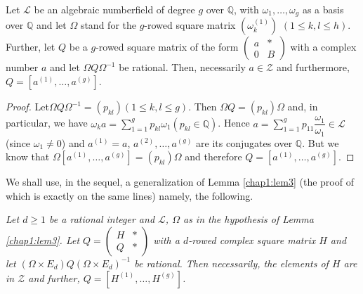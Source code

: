 \begin{lem}\label{chap1:lem3}
Let $\mathscr{L}$ be an algebraic numberfield of degree $g$ over
$\mathbb{Q}$, with $\omega_{1},\ldots,\omega_{g}$ as a basis over
$\mathbb{Q}$ and let $\Omega$ stand for the $g$-rowed square matrix
$(\omega^{(1)}_{k})$ $(1\leq k,l\leq h)$. Further, let $Q$ be a
$g$-rowed square matrix of the form $\left(\begin{smallmatrix} a &
  \ast\\ 0 & B\end{smallmatrix}\right)$ with a complex number $a$ and
  let $\Omega Q\Omega^{-1}$ be rational. Then, necessarily
  $a\in\mathscr{Z}$ and furthermore, $Q=[a^{(1)},\ldots,a^{(g)}]$.
\end{lem}

\begin{proof}
Let\pageoriginale $\Omega Q\Omega^{-1}=(p_{kl})(1\leq k,l\leq g)$. Then $\Omega
Q=(p_{kl})\Omega$ and, in particular, we have
$\omega_{k}a=\sum\limits^{g}_{1=1}p_{kl}\omega_{1}(p_{kl}\in\mathbb{Q})$. Hence
$a=\sum\limits^{g}_{1=1}p_{11}\dfrac{\omega_{1}}{\omega_{1}}\in\mathscr{L}$
(since $\omega_{1}\neq 0$) and $a^{(1)}=a$, $a^{(2)},\ldots,a^{(g)}$
are its conjugates over $\mathbb{Q}$. But we know that
$\Omega[a^{(1)},\ldots,a^{(g)}]=(p_{kl})\Omega$ and therefore
$Q=[a^{(1)},\ldots,a^{(g)}]$. 
\end{proof}

\begin{remark*}
We shall use, in the sequel, a generalization of Lemma \ref{chap1:lem3} (the
proof of which is exactly on the same lines) namely, the
following. 
\end{remark*}

{\em Let $d\geq 1$ be a rational integer and $\mathscr{L}$, $\Omega$
as in the hypothesis of Lemma \ref{chap1:lem3}. Let
$Q=\left(\begin{smallmatrix} H & \ast\\ Q & \ast
\end{smallmatrix}\right)$ with a $d$-rowed complex square matrix $H$
and let $(\Omega\times E_{d})Q(\Omega\times E_{d})^{-1}$ be
rational. Then necessarily, the elements of $H$ are in $\mathscr{Z}$
and further, $Q=[H^{(1)},\ldots,H^{(g)}]$.}

